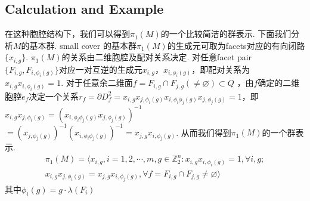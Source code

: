 \documentclass{article}
\theoremstyle{plain}%
\theoremstyle{definition}
\theoremstyle{remark}
\begin{document}
\subsection{Calculation and Example}
在这种胞腔结构下，我们可以得到$\pi_1(M)$的一个比较简洁的群表示. 下面我们分析$M$的基本群. small cover 的基本群$\pi_1(M)$的生成元可取为facets对应的有向闭路$\{x_{i,g}\}$.  $\pi_1(M)$的关系由二维胞腔及配对关系决定. 
对任意facet pair  $\{F_{i,g},F_{i,\phi_i(g)}\}$对应一对互逆的生成元$x_{i,g}$，$x_{i,\phi_i(g)}$，即配对关系为$x_{i,g}x_{i,\phi_i(g)}=1$.  对于任意余二维面$f=F_{i,g}\cap F_{j,g}(\neq \varnothing)\subset Q$
，由$f$确定的二维胞腔$e_f$决定一个关系$r_f=\partial D^2_f=x_{i,g}x_{j,\phi_i(g)}x_{i,\phi_i\phi_j(g)}x_{j,\phi_j(g)}=1$，即$x_{i,g}x_{j,\phi_i(g)}=(x_{i,\phi_i\phi_j(g)}x_{j,\phi_j(g)})^{-1}$\\$=(x_{j,\phi_j(g)})^{-1}(x_{i,\phi_i\phi_j(g)})^{-1}=x_{j,g}x_{i,\phi_j(g)}$. 
从而我们得到$\pi_1(M)$的一个群表示.
\begin{multline}\label{eq0}
\pi_1(M)=\langle x_{i,g},i=1,2,\cdots,m,g\in \mathbb{Z}_2^n:x_{i,g}x_{i,\phi_i(g)}=1,\forall i,g;\\
x_{i,g}x_{j,\phi_i(g)}=x_{j,g}x_{i,\phi_j(g)},\forall f=F_{i,g}\cap F_{j,g}\neq \varnothing\rangle
\end{multline}
其中$\phi_i(g)=g\cdot\lambda(F_i)$
\end{document}
